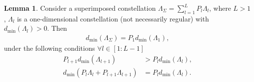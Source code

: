 \documentclass[12pt, draftclsnofoot, onecolumn]{IEEEtran}
\theoremstyle{definition}
\newtheorem{lemma}{Lemma}
\begin{document}
\begin{lemma}\label{prop:dmin3}
Consider a superimposed constellation $\Lambda_{\Sigma} = \sum_{l=1}^LP_l\Lambda_l$, where $L>1$, $\Lambda_l$ is a one-dimensional constellation (not necessarily regular) with $d_{\min}(\Lambda_l)>0$. Then
\begin{align}\label{prop:dmin3_con1a}
d_{\min}(\Lambda_{\Sigma}) = P_1d_{\min}(\Lambda_1),
\end{align}
under the following conditions $\forall l \in [1:L-1]$
\begin{align}
P_{l+1}d_{\min}(\Lambda_{l+1}) &> P_ld_{\min}(\Lambda_{l}), \label{prop:dmin3_con1} \\
d_{\min}(P_l\Lambda_l+P_{l+1}\Lambda_{l+1})&= P_ld_{\min}(\Lambda_l).\label{prop:dmin3_con2b}
\end{align}
\end{lemma}
\end{document}
